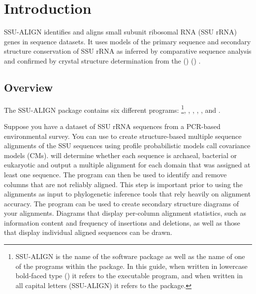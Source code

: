 \section{Introduction}

SSU-ALIGN identifies and aligns small subunit ribosomal RNA
(SSU rRNA) genes in sequence datasets. It uses models of the primary
sequence and secondary structure conservation of SSU rRNA as inferred
by comparative sequence analysis and confirmed by crystal structure
determination from the  () 
()
\cite{CannoneGutell02}.

\subsection{Overview}
The SSU-ALIGN package contains six different
programs: \footnote{SSU-ALIGN is the name of the
  software package as well as the name of one of the programs within
  the package. In this guide, when written in lowercase bold-faced
  type () it refers to the executable program, and
  when written in all capital letters (SSU-ALIGN) it refers to
  the package.},
, , 
, , and . 

Suppose you have a dataset of SSU rRNA sequences from a PCR-based
environmental survey. You can use  to create
structure-based multiple sequence alignments of the
SSU sequences using profile probabilistic models call covariance
models (CMs).  will determine whether each sequence
is archaeal, bacterial or eukaryotic and output a multiple alignment
for each domain that was assigned at least one sequence. 
The  program can then be used to identify and remove
columns that are not reliably aligned. This step is important prior to using the
alignments as input to phylogenetic inference tools that rely heavily
on alignment accuracy.  
The  program can be used to create secondary
structure diagrams of your alignments. Diagrams that display per-column
alignment statistics, such as information content and frequency of
insertions and deletions, as well as those that display individual
aligned sequences can be drawn.

